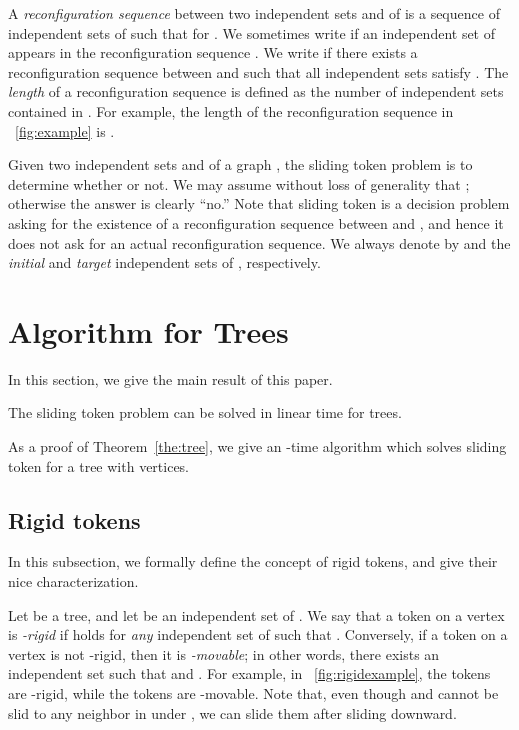 \documentclass{llncs}
\newcounter{two}
\begin{document}
A {\em reconfiguration sequence} between two independent sets  and  of  
is a sequence  of 
independent sets of  such that  for .
We sometimes write  if an independent set  of  appears in the reconfiguration sequence . 
We write  if there exists a reconfiguration sequence  between  and  such that all independent sets  satisfy .
The {\em length} of a reconfiguration sequence  is defined as 
the number of independent sets contained in .
For example, 
the length of the reconfiguration sequence in \figurename~\ref{fig:example} is . 

Given two independent sets  and  of a graph , the {\sc sliding token} problem is to determine whether  or not.
We may assume without loss of generality that ; 
otherwise the answer is clearly ``no.'' 
Note that {\sc sliding token} is 
a decision problem asking for the existence of a reconfiguration sequence 
between  and , and hence it does not ask for an actual reconfiguration sequence. 
We always denote by  and  the {\em initial} and {\em target} independent sets of , 
respectively.



	\section{Algorithm for Trees}
	\label{sec:algorithm}
	
	In this section, we give the main result of this paper. 
	\begin{theorem} \label{the:tree}
	The {\sc sliding token} problem can be solved in linear time for trees. 
	\end{theorem}
	
	As a proof of Theorem~\ref{the:tree}, we give an -time algorithm which solves {\sc sliding token} for a tree with  vertices. 


	
	\subsection{Rigid tokens}
	
	In this subsection, we formally define the concept of rigid tokens, and give their nice characterization. 
\smallskip
	
	Let  be a tree, and let  be an independent set of . 
	We say that a token on a vertex  is \emph{-rigid} if  holds for \emph{any} independent set  of  such that . 
	Conversely, if a token on a vertex  is not -rigid, then it is \emph{-movable};
in other words, there exists an independent set  such that  and . 
	For example, in \figurename~\ref{fig:rigidexample}, the tokens  are -rigid, while the tokens  are -movable. 
	Note that, even though  and  cannot be slid to any neighbor in  under , we can slide them after sliding  downward. 
	
\end{document}
